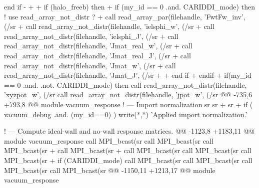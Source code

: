      end if
-      
+
+    if (halo_freeb) then
+      if (my_id == 0 .and. CARIDDI_mode) then ! use read_array_not_distr ?
+        call read_array_par(filehandle, 'FwtFw_inv', (/sr%
+        call read_array_not_distr(filehandle, 'ielsphi_w', (/sr%
+        call read_array_not_distr(filehandle, 'ielsphi_J', (/sr%
+        call read_array_not_distr(filehandle, 'Jmat_real_w', (/sr%
+        call read_array_not_distr(filehandle, 'Jmat_real_J', (/sr%
+        call read_array_not_distr(filehandle, 'Jmat_w', (/sr%
+        call read_array_not_distr(filehandle, 'Jmat_J', (/sr%
+
+      end if   
+    endif
+
     if(my_id == 0 .and. .not. CARIDDI_mode) then
      call read_array_not_distr(filehandle, 'xyzpot_w', (/sr%
      call read_array_not_distr(filehandle, 'jpot_w',   (/sr%
@@ -735,6 +793,8 @@ module vacuum_response
     ! --- Import normalization
     sr%
     sr%
+    sr%
+
     if ( vacuum_debug .and. (my_id==0) ) write(*,*) 'Applied import normalization.'
 
     ! --- Compute ideal-wall and no-wall response matrices.
@@ -1123,8 +1183,11 @@ module vacuum_response
     call MPI_bcast(sr%
     call MPI_bcast(sr%
     call MPI_bcast(sr%
+    call MPI_bcast(sr%
+    call MPI_bcast(sr%
     call MPI_bcast(sr%
     call MPI_bcast(sr%
+    if (CARIDDI_mode) call MPI_bcast(sr%
     call MPI_bcast(sr%
     call MPI_bcast(sr%
     call MPI_bcast(sr%
@@ -1150,11 +1213,17 @@ module vacuum_response
     
